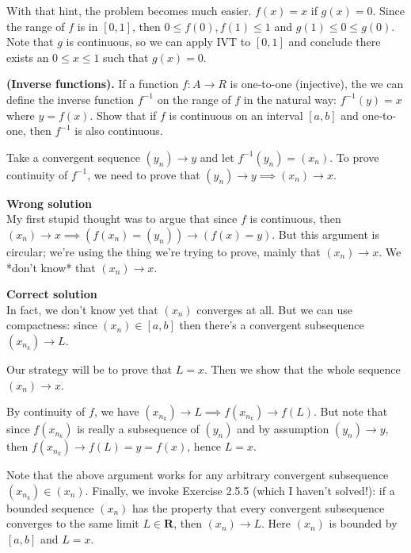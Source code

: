 \documentclass{oxmathproblems}
\begin{document}
\begin{questions}
\begin{solution}
  With that hint, the problem becomes much easier. $f(x)=x$ if $g(x)=0$. Since the range of $f$ is in $[0, 1]$, then $0 \leq f(0), f(1) \leq 1$ and $g(1) \leq 0 \leq g(0)$.
  Note that $g$ is continuous, so we can apply IVT to $[0, 1]$ and conclude there exists an $0 \leq x \leq 1$ such that $g(x)=0$. 
\end{solution}

\miquestion \textbf{(Inverse functions).} If a function $f: A \to R$ is one-to-one (injective), the we can define the inverse function $f^{-1}$ on the range of $f$ in the
natural way: $f^{-1}(y)=x$ where $y=f(x)$. Show that if $f$ is continuous on an interval $[a, b]$ and one-to-one, then $f^{-1}$ is also continuous.

\begin{solution}
  Take a convergent sequence $(y_{n}) \to y$ and let $f^{-1}(y_{n})=(x_{n})$. To prove continuity of $f^{-1}$, we need to prove that $(y_{n}) \to y \implies (x_{n}) \to x$.

  \textbf{Wrong solution}\\
  My first stupid thought was to argue that since $f$ is continuous, then $(x_{n}) \to x \implies (f(x_{n}) = (y_{n})) \to (f(x)=y)$. But this argument is circular; we're using
  the thing we're trying to prove, mainly that $(x_{n}) \to x$. We *don't know* that $(x_{n}) \to x$.
  
  \textbf{Correct solution}\\
  In fact, we don't know yet that $(x_{n})$ converges at all. But we can use compactness: since $(x_{n}) \in [a, b]$ then there's a convergent subsequence $(x_{n_{k}}) \to L$.

  Our strategy will be to prove that $L=x$. Then we show that the whole sequence $(x_{n}) \to x$.

  By continuity of $f$, we have $(x_{n_{k}}) \to L \implies f(x_{n_{k}}) \to f(L)$. But note that since $f(x_{n_{k}})$ is really a subsequence of $(y_{n})$ and
  by assumption $(y_{n}) \to y$, then $f(x_{n_{k}}) \to f(L) = y = f(x)$, hence $L=x$.

  Note that the above argument works for any arbitrary convergent subsequence $(x_{n_{k}}) \in (x_{n})$. Finally, we invoke Exercise 2.5.5 (which I haven't solved!): if a
  bounded sequence $(x_{n})$ has the property that every convergent subsequence converges to the same limit $L \in \textbf{R}$, then $(x_{n}) \to L$. Here $(x_{n})$ is bounded by
  $[a, b]$ and $L=x$.
\end{solution}

\end{questions}
\end{document}
